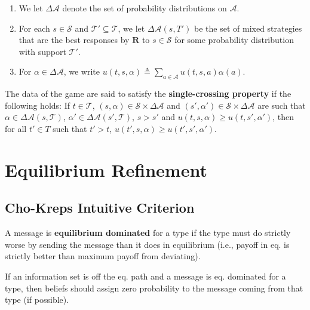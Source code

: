 \documentclass[11pt]{elegantbook}
\begin{document}
\begin{enumerate}
    \item We let $\Delta \mathcal{A}$ denote the set of probability distributions on $\mathcal{A}$.
    \item For each $s\in \mathcal{S}$ and $\mathcal{T}'\subseteq \mathcal{T}$, we let $\Delta\mathcal{A}(s,T')$ be the set of mixed strategies that are the best responses by $\mathbf{R}$ to $s\in \mathcal{S}$ for some probability distribution with support $\mathcal{T}'$.
    \item For $\alpha\in \Delta\mathcal{A}$, we write $u(t,s,\alpha)\triangleq \sum_{a\in \mathcal{A}}u(t,s,a)\alpha(a)$.
\end{enumerate}

\begin{definition}
    \normalfont
    The data of the game are said to satisfy the \textbf{single-crossing property} if the following holds: If $t\in \mathcal{T}$, $(s,\alpha)\in \mathcal{S}\times \Delta\mathcal{A}$ and $(s',\alpha')\in \mathcal{S}\times \Delta\mathcal{A}$ are such that $\alpha\in \Delta\mathcal{A}(s,\mathcal{T})$, $\alpha'\in \Delta\mathcal{A}(s',\mathcal{T})$, $s>s'$ and $u(t,s,\alpha)\geq u(t,s',\alpha')$, then for all $t'\in T$ such that $t'>t$, $u(t',s,\alpha)\geq u(t',s',\alpha')$.
\end{definition}



\section{Equilibrium Refinement}
\subsection{Cho-Kreps Intuitive Criterion}
\begin{definition}
    \normalfont
    A message is \textbf{equilibrium dominated} for a type if the type must do strictly worse by sending the message than it does in equilibrium (i.e., payoff in eq. is strictly better than maximum payoff from deviating).
\end{definition}

\begin{definition}
    \normalfont
    If an information set is off the eq. path and a message is eq. dominated for a type, then beliefs should assign zero probability to the message coming from that type (if possible).
\end{definition}
\end{document}
